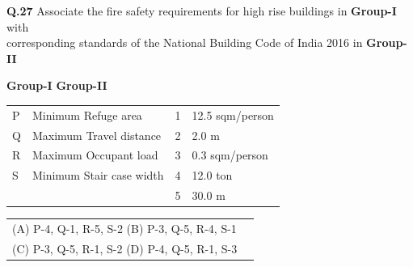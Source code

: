 \documentclass[journal,12pt,onecolumn]{IEEEtran}
\theoremstyle{remark}
\begin{document}
 \vspace{0.8cm}
\noindent \textbf{Q.27} \quad Associate the fire safety requirements for high rise buildings in \textbf{Group-I} with \\
\hspace*{3.3em} corresponding standards of the National Building Code of India 2016 in \textbf{Group-II} 

\vspace{1em}


\hspace{3cm} \textbf{Group-I} \hspace{8cm} \textbf{Group-II} \\ 
\vspace{0.5cm}
\begin{tabular}{llcl} \vspace{0.15cm}
\hspace{2cm}P & Minimum Refuge area & \hspace{4.4cm} 1 & 12.5 sqm/person \\ \vspace{0.15cm}
\hspace{2cm}Q & Maximum Travel distance &\hspace{4.4cm} 2 & 2.0 m \\  \vspace{0.15cm}
\hspace{2cm}R & Maximum Occupant load & \hspace{4.4cm} 3 & 0.3 sqm/person \\ \vspace{0.15cm}
\hspace{2cm}S & Minimum Stair case width & \hspace{4.4cm}4 & 12.0 ton \\ \vspace{0.15cm} 
  &                           & \hspace{4.4cm}5 & 30.0 m \\
\end{tabular}

\bigskip

\begin{tabular}{ll}
\hspace{2cm}(A)  P-4, Q-1, R-5, S-2 
\hspace{4cm}(B)  P-3, Q-5, R-4, S-1 \\  \vspace{0.5cm}
\hspace{2cm}(C)  P-3, Q-5, R-1, S-2 
\hspace{4cm}(D)  P-4, Q-5, R-1, S-3 
\end{tabular}
\end{document}
